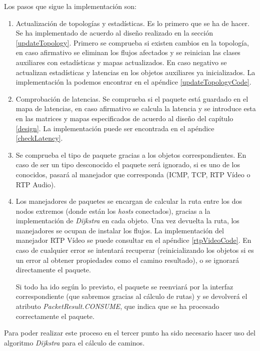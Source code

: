\documentclass[a4paper,11pt]{book}
\begin{document}
Los pasos que sigue la implementación son:
\begin{enumerate}
\item Actualización de topologías y estadísticas. Es lo primero que se ha de hacer. Se ha implementado de acuerdo al diseño realizado en la sección \ref{updateTopology}. Primero se comprueba si existen cambios en la topología, en caso afirmativo se eliminan los flujos afectados y se reinician las clases auxiliares con estadísticas y mapas actualizados. En caso negativo se actualizan estadísticas y latencias en los objetos auxiliares ya inicializados. La implementación la podemos encontrar en el apéndice \ref{updateTopologyCode}.

\item Comprobación de latencias. Se comprueba si el paquete está guardado en el mapa de latencias, en caso afirmativo se calcula la latencia y se introduce esta en las matrices y mapas especificados de acuerdo al diseño del capítulo \ref{design}. La implementación puede ser encontrada en el apéndice \ref{checkLatency}.

\item Se comprueba el tipo de paquete gracias a los objetos correspondientes. En caso de ser un tipo desconocido el paquete será ignorado, si es uno de los conocidos, pasará al manejador que corresponda (\ac{ICMP}, \ac{TCP}, \ac{RTP} Vídeo o \ac{RTP} Audio). 

\item Los manejadores de paquetes se encargan de calcular la ruta entre los dos nodos extremos (donde están los \textit{hosts} conectados), gracias a la implementación de \textit{Dijkstra} en cada objeto. Una vez devuelta la ruta, los manejadores se ocupan de instalar los flujos. La implementación del manejador \ac{RTP} Vídeo se puede consultar en el apéndice \ref{rtpVideoCode}. En caso de cualquier error se intentará recuperar (reinicializando los objetos si es un error al obtener propiedades como el camino resultado), o se ignorará directamente el paquete. 

Si todo ha ido según lo previsto, el paquete se reenviará por la interfaz correspondiente (que sabremos gracias al cálculo de rutas) y se devolverá el atributo \textit{PacketResult.CONSUME}, que indica que se ha procesado correctamente el paquete. 

\end{enumerate}

Para poder realizar este proceso en el tercer punto ha sido necesario hacer uso del algoritmo \textit{Dijkstra} para el cálculo de caminos.
\end{document}
